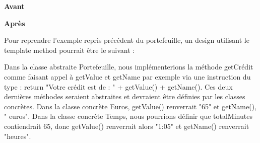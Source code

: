 \begin{description}
\begin{minipage}{.5\textwidth}
\begin{center} \textbf{Avant}


\end{center}
\end{minipage}
\hspace{0.3cm}
\begin{minipage}{.5\textwidth}
\begin{center} \textbf{Après}\end{center}


\end{minipage}
\vspace{0.3cm}


Pour reprendre l'exemple repris précédent du portefeuille,  un design utilisant le template method pourrait être le suivant : \\

\vspace{0.3cm}
\begin{minipage}{.5\textwidth}
\begin{center} 
\begin{justify}
Dans la classe abstraite Portefeuille,  nous implémenterions la méthode getCrédit comme faisant appel à getValue et getName par exemple via une instruction du type : return "Votre crédit est de : " + getValue() + getName().  Ces deux dernières méthodes seraient abstraites et devraient être définies par les classes concrètes.  Dans la classe concrète Euros,  getValue() renverrait "65" et getName(),  " euros".   Dans la classe concrète Temps,  nous pourrions définir que totalMinutes contiendrait 65,  donc getValue() renverrait alors "1:05" et getName() renverrait "heures".  
\end{justify}
\end{center}
\end{minipage}
\hspace{0.3cm}
\begin{minipage}{.5\textwidth}
\begin{center} 
\end{center}
\end{minipage}
\vspace{0.3cm}


\end{description}
